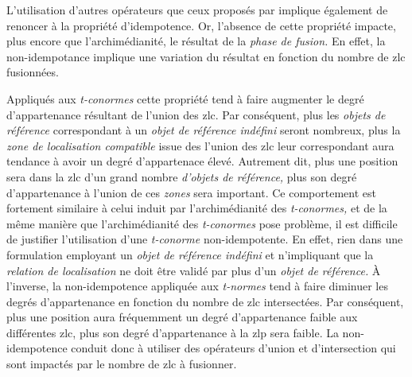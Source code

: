 L'utilisation d'autres opérateurs que ceux proposés par
\textcite{Zadeh1965} implique également de renoncer à la propriété
d'idempotence. Or, l'absence de cette propriété impacte, plus encore
que l'archimédianité, le résultat de la \emph{phase de fusion.} En
effet, la non-idempotance implique une variation du résultat en
fonction du nombre de \ac{zlc} fusionnées.

Appliqués aux \emph{t-conormes} cette propriété tend à faire augmenter
le degré d’appartenance résultant de l'union des \ac{zlc}. Par
conséquent, plus les \emph{objets de référence} correspondant à un
\emph{objet de référence indéfini} seront nombreux, plus la \emph{zone
  de localisation compatible} issue des l'union des \ac{zlc} leur
correspondant aura tendance à avoir un degré d'appartenace
élevé. Autrement dit, plus une position sera dans la \ac{zlc} d'un
grand nombre \emph{d'objets de référence,} plus son degré
d'appartenance à l'union de ces \emph{zones} sera important. Ce
comportement est fortement similaire à celui induit par
l'archimédianité des \emph{t-conormes,} et de la même manière que
l'archimédianité des \emph{t-conormes} pose problème, il est difficile
de justifier l'utilisation d'une \emph{t-conorme} non-idempotente. En
effet, rien dans une formulation employant un \emph{objet de référence
  indéfini} et n'impliquant que la \emph{relation de localisation} ne
doit être validé par plus d'un \emph{objet de référence.} À l'inverse,
la non-idempotence appliquée aux \emph{t-normes} tend à faire diminuer
les degrés d'appartenance en fonction du nombre de \ac{zlc}
intersectées. Par conséquent, plus une position aura fréquemment un
degré d'appartenance faible aux différentes \ac{zlc}, plus son degré
d'appartenance à la \ac{zlp} sera faible. La non-idempotence conduit
donc à utiliser des opérateurs d'union et d'intersection qui sont
impactés par le nombre de \ac{zlc} à fusionner.

